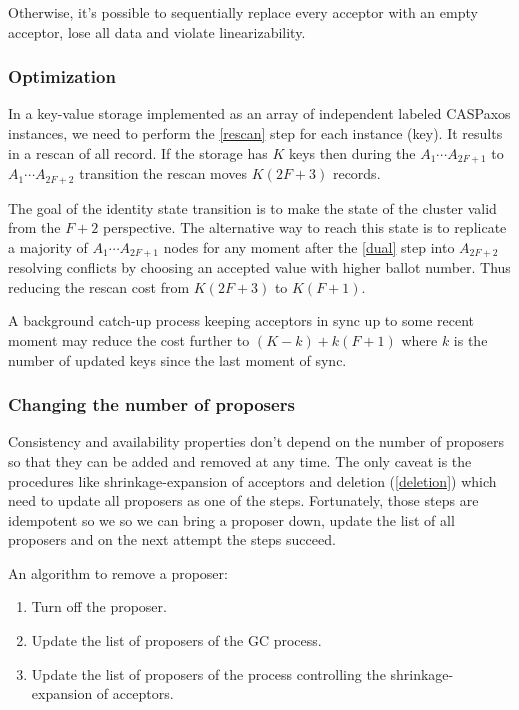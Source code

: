 \documentclass[12pt]{article}
\theoremstyle{definition}
\begin{document}
Otherwise, it's possible to sequentially replace every acceptor with an empty acceptor, lose all data and violate linearizability.

\subsubsection{Optimization}

In a key-value storage implemented as an array of independent labeled CASPaxos instances, we need to perform the \ref{rescan} step for each instance (key). It results in a rescan of all record. If the storage has $K$ keys then during the $A_1 \cdots A_{2F+1}$ to $A_1 \cdots A_{2F+2}$ transition the rescan moves $K(2F+3)$ records.

The goal of the identity state transition is to make the state of the cluster valid from the $F+2$ perspective. The alternative way to reach this state is to replicate a majority of $A_1 \cdots A_{2F+1}$ nodes for any moment after the \ref{dual} step into $A_{2F+2}$ resolving conflicts by choosing an accepted value with higher ballot number. Thus reducing the rescan cost from $K(2F+3)$ to $K(F+1)$.

A background catch-up process keeping acceptors in sync up to some recent moment may reduce the cost further to $(K-k) + k(F+1)$ where $k$ is the number of updated keys since the last moment of sync.

\subsubsection{Changing the number of proposers}

Consistency and availability properties don't depend on the number of proposers so that they can be added and removed at any time. The only caveat is the procedures like shrinkage-expansion of acceptors and deletion (\ref{deletion}) which need to update all proposers as one of the steps. Fortunately, those steps are idempotent so we so we can bring a proposer down, update the list of all proposers and on the next attempt the steps succeed.

An algorithm to remove a proposer:

\begin{enumerate}
  \item Turn off the proposer.
  \item Update the list of proposers of the GC process.
  \item Update the list of proposers of the process controlling the shrinkage-expansion of acceptors.
\end{enumerate}
\end{document}
